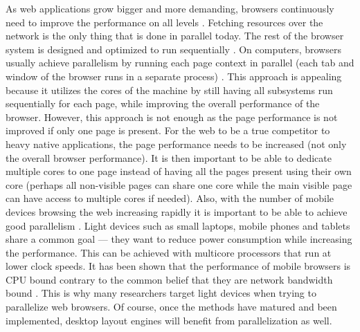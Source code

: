\documentclass[a4paper,11pt]{kth-mag}
\begin{document}
        As \gls{web} applications grow bigger and more demanding, \glspl{browser} continuously need to improve the performance on all levels \cite{parallelizing_the_web_browser}.
        Fetching resources over the network is the only thing that is done in parallel today.
        The rest of the \gls{browser} system is designed and optimized to run sequentially \cite{zoomm}.
        On computers, \glspl{browser} usually achieve parallelism by running each page context in parallel (each tab and window of the \gls{browser} runs in a separate process) \cite{fan2011optimizing,zoomm}.
        This approach is appealing because it utilizes the cores of the machine by still having all subsystems run sequentially for each page, while improving the overall performance of the \gls{browser}.
        However, this approach is not enough as the page performance is not improved if only one page is present.
        For the \gls{web} to be a true competitor to heavy \gls{native} applications, the page performance needs to be increased (not only the overall \gls{browser} performance).
        It is then important to be able to dedicate multiple cores to one page instead of having all the pages present using their own core (perhaps all non-visible pages can share one core while the main visible page can have access to multiple cores if needed).
        Also, with the number of mobile devices browsing the \gls{web} increasing rapidly it is important to be able to achieve good parallelism \cite{meyerovich2010fast,parallelizing_the_web_browser}.
        Light devices such as small laptops, mobile phones and tablets share a common goal --- they want to reduce power consumption while increasing the performance.
        This can be achieved with multicore processors that run at lower clock speeds.
        It has been shown that the performance of mobile \glspl{browser} is \gls{CPU} bound contrary to the common belief that they are network bandwidth bound \cite{parallelizing_the_web_browser,meyerovich2010fast}.
        This is why many researchers target light devices when trying to parallelize \gls{web} \glspl{browser}.
        Of course, once the methods have matured and been implemented, desktop \glspl{layout engine} will benefit from parallelization as well.
\end{document}
